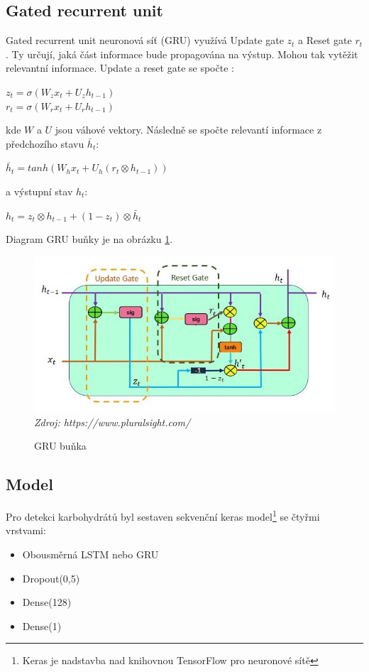 \subsection{Gated recurrent unit}

Gated recurrent unit neuronová síť (GRU) využívá Update gate $z_{t}$ a Reset gate $r_{t}$. Ty určují, jaká část informace bude propagována na výstup. Mohou tak vytěžit relevantní informace. Update a reset gate se spočte \citep{cho.gru}:

$z_{t}=\sigma(W_{z}x_{t} + U_{z}h_{t-1})$\\\indent
$r_{t}=\sigma(W_{r}x_{t} + U_{r}h_{t-1})$

\noindent kde $W$ a $U$ jsou váhové vektory. Následně se spočte relevantí informace z předchozího stavu $\bar{h}_{t}$:

$\bar{h}_{t}=tanh(W_{h}x_{t} + U_{h}(r_{t} \otimes h_{t-1}))$

\noindent a výstupní stav $h_{t}$:

$h_{t}=z_{t} \otimes h_{t-1} + (1-z_{t}) \otimes \bar{h}_{t}$

Diagram GRU buňky je na obrázku \ref{fig:gru_cell}.

\begin{figure}[H]
\caption{GRU buňka}
\label{fig:gru_cell}
\centering
\includegraphics[width=1\textwidth]{img/cho/gru_cell.jpg}
\textit{Zdroj: https://www.pluralsight.com/}
\end{figure}

\subsection{Model}

Pro detekci karbohydrátů byl sestaven sekvenční keras model\footnote{Keras je nadstavba nad knihovnou TensorFlow pro neuronové sítě} se čtyřmi vrstvami:
\begin{itemize}
\setlength\itemsep{0em}
\item Obousměrná LSTM nebo GRU
\item Dropout(0,5)
\item Dense(128)
\item Dense(1)
\end{itemize}


